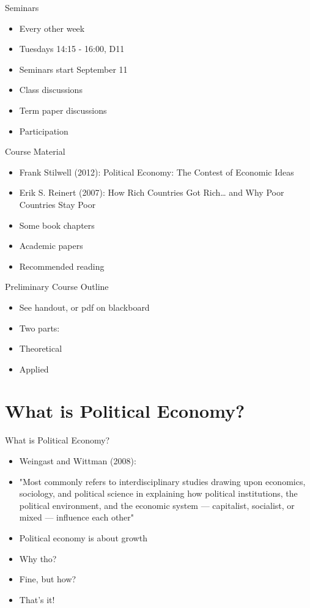 \documentclass[10pt, show notes]{beamer}
\begin{document}
\begin{frame}{Seminars}
\begin{itemize}[<+- | alert@+>]
	\item Every other week
	\item Tuesdays 14:15 - 16:00, D11
	\item Seminars start September 11
	\item Class discussions
	\item Term paper discussions
	\item Participation
\end{itemize}
\end{frame}

\begin{frame}{Course Material}
\begin{itemize}[<+- | alert@+>]
	\item Frank Stilwell (2012): Political Economy: The Contest of Economic Ideas
	\item Erik S. Reinert (2007): How Rich Countries Got Rich… and Why Poor Countries Stay Poor
	\item Some book chapters
	\item Academic papers
	\item Recommended reading
\end{itemize}
\end{frame}

\begin{frame}{Preliminary Course Outline}
\begin{itemize}[<+- | alert@+>]
	\item See handout, or pdf on blackboard
	\item Two parts:
	\item Theoretical
	\item Applied
\end{itemize}
\end{frame}

\section{What is Political Economy?}

\begin{frame}{What is Political Economy?}
\begin{itemize}[<+- | alert@+>]
	\item Weingast and Wittman (2008):
	\item "Most commonly refers to interdisciplinary studies drawing upon economics, sociology, and political science in explaining how political institutions, the political environment, and the economic system — capitalist, socialist, or mixed — influence each other"
	\item Political economy is about growth
	\item Why tho?
	\item Fine, but how?
	\item That's it!
\end{itemize}
\end{frame}
\end{document}
